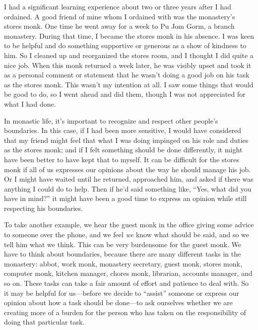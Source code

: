
I had a significant learning experience about two or three years after 
I had ordained. A good friend of mine whom I ordained with was the 
monastery's stores monk. One time he went away for a week to Pu Jom 
Gorm, a branch monastery. During that time, I became the stores monk in 
his absence. I was keen to be helpful and do something supportive or 
generous as a show of kindness to him. So I cleaned up and reorganized 
the stores room, and I thought I did quite a nice job. When this monk 
returned a week later, he was visibly upset and took it as a personal 
comment or statement that he wasn't doing a good job on his task as the 
stores monk. This wasn't my intention at all. I saw some things that 
would be good to do, so I went ahead and did them, though I was not 
appreciated for what I had done.

In monastic life, it's important to recognize and respect other 
people's boundaries. In this case, if I had been more sensitive, I 
would have considered that my friend might feel that what I was doing 
impinged on his role and duties as the stores monk; and if I felt 
something should be done differently, it might have been better to have 
kept that to myself. It can be difficult for the stores monk if all of 
us expresses our opinions about the way he should manage his job. Or I 
might have waited until he returned, approached him, and asked if there 
was anything I could do to help. Then if he'd said something like, 
``Yes, what did you have in mind?'' it might have been a good time to 
express an opinion while still respecting his boundaries.

To take another example, we hear the guest monk in the office giving 
some advice to someone over the phone, and we feel \emph{we} know what 
should be said, and so we tell him what we think. This can be very 
burdensome for the guest monk. We have to think about boundaries, 
because there are many different tasks in the monastery: abbot, work 
monk, monastery secretary, guest monk, stores monk, computer monk, 
kitchen manager, chores monk, librarian, accounts manager, and so on. 
These tasks can take a fair amount of effort and patience to deal with. 
So it may be helpful for us---before we decide to ``assist'' someone or 
express our opinion about how a task should be done---to ask ourselves 
whether we are creating more of a burden for the person who has taken 
on the responsibility of doing that particular task.

